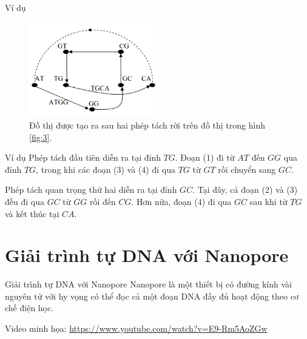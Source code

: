 \documentclass[10pt]{beamer}
\theoremstyle{remark}
\numberwithin{algocf}{section}
\numberwithin{equation}{section}
\numberwithin{dl}{section}
\numberwithin{figure}{section}
\begin{document}
\begin{frame}{Ví dụ}
    \begin{figure}[h!]
        \centering
        \includegraphics[width=0.5\textwidth]{8.png}
        \caption{Đồ thị được tạo ra sau hai phép tách rời trên đồ thị trong hình \ref{fig:3}.}
        \label{fig:8}
    \end{figure}

    
\end{frame}

\begin{frame}{Ví dụ}
    Phép tách đầu tiên diễn ra tại đỉnh $TG$. Đoạn (1) đi từ $AT$ đến $GG$ qua đỉnh $TG$, trong khi các đoạn (3) và (4) đi qua $TG$ từ $GT$ rồi chuyển sang $GC$.

    Phép tách quan trọng thứ hai diễn ra tại đỉnh $GC$. Tại đây, cả đoạn (2) và (3) đều đi qua $GC$ từ $GG$ rồi đến $CG$. 
    Hơn nữa, đoạn (4) đi qua $GC$ sau khi từ $TG$ và kết thúc tại $CA$.
\end{frame}

\section{Giải trình tự DNA với Nanopore}

\begin{frame}{Giải trình tự DNA với Nanopore}
    Nanopore là một thiết bị có đường kính vài nguyên tử với hy vọng có thể đọc cả một đoạn DNA đầy đủ hoạt động theo cơ chế điện học.

    Video minh họa: \url{https://www.youtube.com/watch?v=E9-Rm5AoZGw}
\end{frame}
\end{document}
